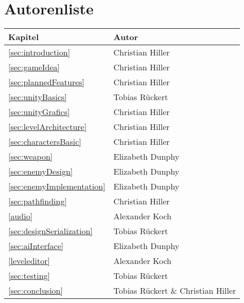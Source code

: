 \section{Autorenliste}\label{sec:authors}

\begin{tabular}{|l|l|}
	\hline
  	Kapitel & Autor \\
  	\hline
  	\ref{sec:introduction} & Christian Hiller \\
  	\hline
  	\ref{sec:gameIdea} & Christian Hiller \\
  	\hline
  	\ref{sec:plannedFeatures} & Christian Hiller \\
  	\hline
  	\ref{sec:unityBasics} & Tobias Rückert \\
  	\hline
  	\ref{sec:unityGrafics} & Christian Hiller \\
  	\hline
  	\ref{sec:levelArchitecture} & Christian Hiller \\
  	\hline
  	\ref{sec:charactersBasic} & Christian Hiller \\
	\hline
  	\ref{sec:weapon} & Elizabeth Dunphy \\
  	\hline
  	\ref{sec:enemyDesign} & Elizabeth Dunphy \\
  	\hline
  	\ref{sec:enemyImplementation} & Elizabeth Dunphy \\
  	\hline
  	\ref{sec:pathfinding} & Christian Hiller \\
	\hline
	\ref{audio} & Alexander Koch \\
	\hline
	\ref{sec:designSerialization} & Tobias Rückert \\
	\hline
	\ref{sec:aiInterface} & Elizabeth Dunphy \\
  	\hline
  	\ref{leveleditor} & Alexander Koch \\
	\hline
	\ref{sec:testing} & Tobias Rückert \\
	\hline
	\ref{sec:conclusion} & Tobias Rückert \& Christian Hiller \\
	\hline
\end{tabular}
